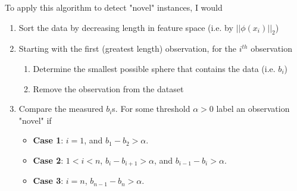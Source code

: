 \documentclass[paper=a4, fontsize=11pt]{scrartcl} %
\numberwithin{equation}{section} %
\numberwithin{figure}{section} %
\numberwithin{table}{section} %
\begin{document}
To apply this algorithm to detect "novel" instances, I would
\begin{enumerate}
\item Sort the data by decreasing length in feature space (i.e. by $||\phi(x_i)||_2$)
\item Starting with the first (greatest length) observation, for the $i^{th}$ observation
\begin{enumerate}
\item Determine the smallest possible sphere that contains the data (i.e. $b_i$)
\item Remove the observation from the dataset
\end{enumerate}
\item Compare the measured $b_i$s. For some threshold $\alpha > 0$ label an observation "novel" if
\begin{itemize}
\item \textbf{Case 1}: $i = 1$, and $b_1 - b_2 > \alpha$.
\item \textbf{Case 2}: $1 < i < n$,  $b_i  - b_{i+1} > \alpha$, and $b_{i-1} - b_i > \alpha$.
\item \textbf{Case 3}: $ i = n$,  $b_{n-1} - b_n > \alpha$.
\end{itemize}
\end{enumerate}

\end{document}
